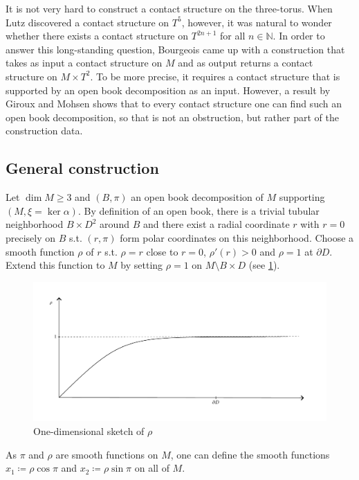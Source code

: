 It is not very hard to construct a contact structure on the three-torus. 
When Lutz \cite{Lutz79} discovered a contact structure on $T^5$, however,
it was natural to wonder whether there exists a contact structure on $T^{2n+1}$ for all $n \in \mathbb N$.
In order to answer this long-standing question, Bourgeois \cite{Bourgeois02} came up with a construction that takes as input a contact structure on $M$ 
and as output returns a contact structure on $M\times T^2$.
To be more precise, it requires a contact structure that is supported by an open book decomposition as an input.
However, a result by Giroux and Mohsen \cite[Theorem 7.3.5]{Geiges08} shows that to every contact structure one can find such an open book decomposition,
so that is not an obstruction, but rather part of the construction data.

\subsection{General construction}
Let $\operatorname{dim} M \geq 3$ and $(B, \pi)$ an open book decomposition of $M$ supporting $(M, \xi = \ker \alpha)$.
By definition of an open book, there is a trivial tubular neighborhood $B \times D^2$ around $B$ and there exist a radial coordinate $r$ with $r = 0$ precisely on $B$
s.t. $(r, \pi)$ form polar coordinates on this neighborhood.
Choose a smooth function $\rho$ of $r$ s.t. $\rho = r$ close to $r = 0$, $\rho'(r) > 0$ and $\rho = 1$ at $\partial D$.
Extend this function to $M$ by setting $\rho = 1$ on $M \setminus B \times D$ (see \cref{fig:rho}).
\begin{figure}
    \includegraphics*[width=\textwidth]{../images/rho.pdf}
    \caption{One-dimensional sketch of $\rho$}
    \label{fig:rho}
\end{figure}
As $\pi$ and $\rho$ are smooth functions on $M$, one can define the smooth functions $x_1 \coloneqq \rho \cos \pi$ and $x_2 \coloneqq \rho \sin \pi$ on all of $M$. 

